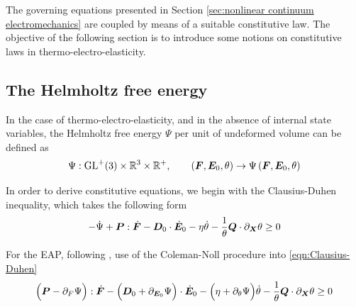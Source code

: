 The governing equations presented in Section \ref{sec:nonlinear continuum electromechanics} are coupled by means of a suitable constitutive law. 
The objective of the following section is to introduce some notions on  constitutive laws in thermo-electro-elasticity. 

\subsection{The Helmholtz free energy}\label{sec:helmholtz}



In the case of thermo-electro-elasticity, and in the absence of internal state variables, the Helmholtz free energy $\Psi$ per unit of undeformed volume can be defined as
%
%
\begin{equation}\label{eqn:definition of CMV}
\Psi:\text{GL}^{+}(3)\times \mathbb{R}^3\times \mathbb{R}^+,\qquad \left(\boldsymbol{F},\boldsymbol{E}_0,\theta\right)\rightarrow \Psi\left(\boldsymbol{F},\boldsymbol{E}_0,\theta\right)
\end{equation}
%

In order to derive constitutive equations, we begin with the Clausius-Duhen inequality, which takes the following form
%
\begin{equation}\label{eqn:Clausius-Duhen}
-\dot{\Psi} + \boldsymbol{P}:\dot{\boldsymbol{F}} - \boldsymbol{D}_0\cdot \dot{\boldsymbol{E}}_0 - \eta \dot{\theta} - \frac{1}{\theta}\boldsymbol{Q}\cdot \partial_{\boldsymbol{X}}\theta \geq 0
\end{equation}


For the EAP, following \cite{XXX}, use of the Coleman-Noll procedure into \eqref{eqn:Clausius-Duhen}
%
\begin{equation}
\begin{aligned}
\Big(\boldsymbol{P} - \partial_{F}\Psi\Big):\dot{\boldsymbol{F}} - \Big(\boldsymbol{D}_0 + \partial_{\boldsymbol{E}_0}\Psi\Big)\cdot \dot{\boldsymbol{E}}_0 - \Big(\eta + \partial_{\theta}\Psi\Big) \dot{\theta} - \frac{1}{\theta}\boldsymbol{Q}\cdot \partial_{\boldsymbol{X}}\theta \geq 0
\end{aligned}	
\end{equation}


